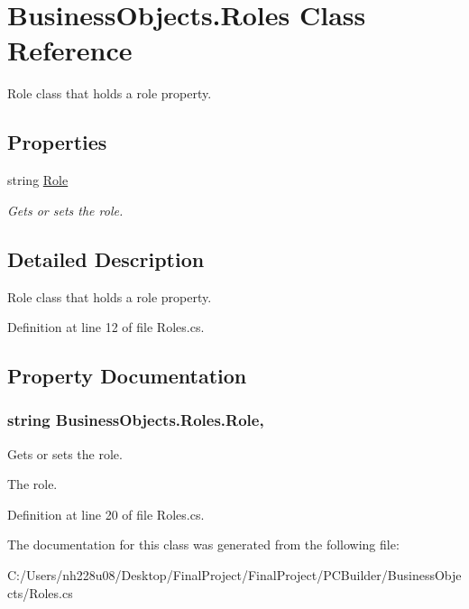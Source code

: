\hypertarget{class_business_objects_1_1_roles}{}\section{Business\+Objects.\+Roles Class Reference}
\label{class_business_objects_1_1_roles}


Role class that holds a role property.  


\subsection*{Properties}
\begin{DoxyCompactItemize}
\item 
string \hyperlink{class_business_objects_1_1_roles_ac3d92844ec99b3c5d19117a5d110c1fd}{Role}
\begin{DoxyCompactList}\small\item\em Gets or sets the role. \end{DoxyCompactList}\end{DoxyCompactItemize}


\subsection{Detailed Description}
Role class that holds a role property. 



Definition at line 12 of file Roles.\+cs.



\subsection{Property Documentation}
\subsubsection[{\texorpdfstring{Role}{Role}}]{\setlength{\rightskip}{0pt plus 5cm}string Business\+Objects.\+Roles.\+Role\hspace{0.3cm}{\ttfamily [get]}, {\ttfamily [set]}}\hypertarget{class_business_objects_1_1_roles_ac3d92844ec99b3c5d19117a5d110c1fd}{}\label{class_business_objects_1_1_roles_ac3d92844ec99b3c5d19117a5d110c1fd}


Gets or sets the role. 

The role. 

Definition at line 20 of file Roles.\+cs.



The documentation for this class was generated from the following file\+:\begin{DoxyCompactItemize}
\item 
C\+:/\+Users/nh228u08/\+Desktop/\+Final\+Project/\+Final\+Project/\+P\+C\+Builder/\+Business\+Objects/Roles.\+cs\end{DoxyCompactItemize}
